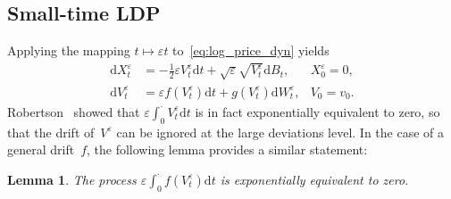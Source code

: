 \documentclass{amsart}[11pt]
\numberwithin{equation}{section}
\numberwithin{theorem}{subsection}
\numberwithin{proposition}{subsection}
\numberwithin{definition}{subsection}
\newtheorem{lemma}{Lemma}
\numberwithin{lemma}{subsection}
\numberwithin{assumption}{subsection}
\newcommand{\Wf}{\boldsymbol{\mathrm{W}}}
\newcommand{\vrho}{\boldsymbol{\mathrm{\varrho}}}
\newcommand{\D}{\mathrm{d}}
\newcommand{\eps}{\varepsilon}
\newcommand{\seps}{\sqrt{\eps}}
\begin{document}
\subsection{Small-time LDP}
Applying the mapping $t\mapsto \eps t$ to~\eqref{eq:log_price_dyn} yields
\begin{equation}\label{eq:log_price_dynSmallTime}
\begin{array}{rll}
\D X_t^\eps & = \displaystyle  -\frac{1}{2}\eps V_t^\eps \D t + \seps\sqrt{V_t^\eps} \D B_t,
 & X_0^\eps = 0,\\
\D V_t^\eps & = \displaystyle \eps f(V_t^\eps)\D t + g(V_t^\eps) \D W^{\eps}_t, & V_0 = v_0.
\end{array}
\end{equation}
Robertson~\cite{Robertson2010} showed that $\eps\int_{0}^{\cdot} V_t^\eps \D t$ is in fact exponentially equivalent to zero,
so that the drift of~$V^\eps$ can be ignored at the large deviations level. 
In the case of a general drift~$f$, the following lemma provides a similar statement:
\begin{lemma}
The process $\eps\int_{0}^{\cdot} f(V_t^\eps) \D t$ is exponentially equivalent to zero.
\end{lemma}
\end{document}
